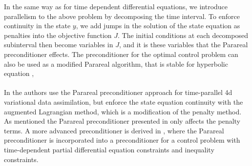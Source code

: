 In the same way as for time dependent differential equations, we introduce parallelism to the above problem by decomposing the time interval. To enforce continuity in the state $y$, we add jumps in the solution of the state equation as penalties into the objective function $J$. The initial conditions at each decomposed subinterval then become variables in $J$, and it is these variables that the Parareal preconditioner effects. The preconditioner for the optimal control problem can also be used as a modified Parareal algorithm, that is stable for hyperbolic equation \cite{chen2015adjoint},
\\
\\
In \cite{rao2016time} the authors use the Parareal preconditioner approach for time-parallel 4d variational data assimilation, but enforce the state equation continuity with the augmented Lagrangian method, which is a modification of the penalty method\cite{nocedal2006numerical}. As mentioned the Parareal preconditioner presented in \cite{maday2002parareal} only affects the penalty terms. A more advanced preconditioner is derived in \cite{ulbrich2015preconditioners}, where the Parareal preconditioner is incorporated into a preconditioner for a control problem with time-dependent partial differential equation constraints and inequality constraints.
